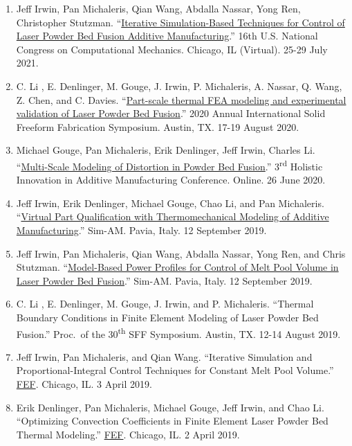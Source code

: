 \documentclass[10.5pt,letterpaper]{article}
\begin{document}
\begin{enumerate}[leftmargin=*]
	\setlength{\parskip}{0em}
	\item Jeff Irwin, Pan Michaleris, Qian Wang, Abdalla Nassar, Yong Ren, Christopher Stutzman. ``\href{https://player.vimeo.com/video/581569814}{Iterative Simulation-Based Techniques for Control of Laser Powder Bed Fusion Additive Manufacturing}.'' 16th U.S. National Congress on Computational Mechanics. Chicago, IL (Virtual).  25-29 July 2021.
	\item C. Li , E. Denlinger, M. Gouge, J. Irwin, P. Michaleris, A. Nassar, Q. Wang, Z. Chen, and C. Davies. ``\href{http://www.programmaster.org/PM/PM.nsf/ApprovedAbstracts/22EF15232DA24C648525855B0050B6B1?OpenDocument}{Part-scale thermal FEA modeling and experimental validation of Laser Powder Bed Fusion}.'' 2020 Annual International Solid Freeform Fabrication Symposium. Austin, TX.  17-19 August 2020.
	\item Michael Gouge, Pan Michaleris, Erik Denlinger, Jeff Irwin, Charles Li. ``\href{https://nserc-hi-am.ca/2020/conference-program/}{Multi-Scale Modeling of Distortion in Powder Bed Fusion}.'' 3\textsuperscript{rd} Holistic Innovation in Additive Manufacturing Conference. Online.  26 June 2020.
	\item Jeff Irwin, Erik Denlinger, Michael Gouge, Chao Li, and Pan Michaleris.  ``\href{http://congress.cimne.com/sim-am2019/frontal/Doc/IndustrialWorkshops/Autodesk.pdf}{Virtual Part Qualification with Thermomechanical Modeling of Additive Manufacturing}.'' Sim-AM.  Pavia, Italy.  12 September 2019.
	\item Jeff Irwin, Pan Michaleris, Qian Wang,  Abdalla  Nassar, Yong Ren, and Chris Stutzman.  ``\href{http://congress.cimne.com/sim-am2019/admin/files/fileabstract/a464.pdf}{Model-Based Power Profiles for Control of Melt Pool Volume in Laser Powder Bed Fusion}.'' Sim-AM.  Pavia, Italy.  12 September 2019.
	\item C. Li , E. Denlinger, M. Gouge, J. Irwin, and P. Michaleris. ``Thermal Boundary Conditions in Finite Element Modeling of Laser Powder Bed Fusion.'' Proc.\ of the 30\textsuperscript{th} SFF Symposium. Austin, TX.  12-14 August 2019.
	\item Jeff Irwin, Pan Michaleris, and Qian Wang.  ``Iterative Simulation and Proportional-Integral Control Techniques for Constant Melt Pool Volume.''  \href{http://www.fef2019.org/}{FEF}\@.  Chicago, IL.  3 April 2019.
	\item Erik Denlinger, Pan Michaleris, Michael Gouge, Jeff Irwin, and Chao Li.  ``Optimizing Convection Coefficients in Finite Element Laser Powder Bed Thermal Modeling.''  \href{http://www.fef2019.org/}{FEF}\@.  Chicago, IL.  2 April 2019.

\end{enumerate}
\end{document}
